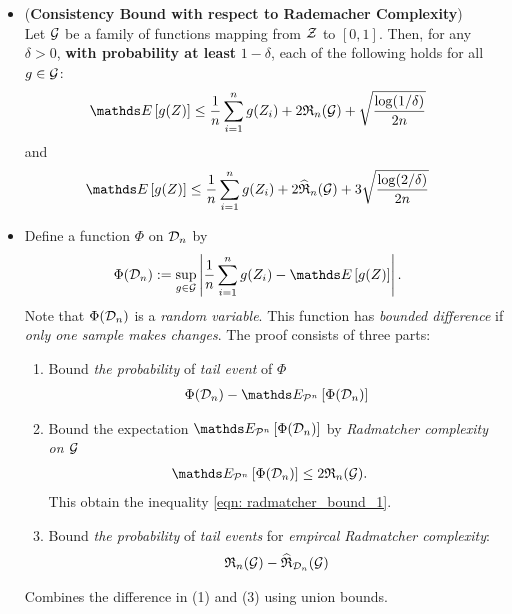\documentclass[11pt]{article}
\begin{document}
\begin{itemize}
\item \begin{proposition} (\textbf{Consistency Bound with respect to Rademacher Complexity}) \citep{mohri2018foundations}\\
Let ${\mathcal G}$ be a family of functions mapping from ${\mathcal Z}$ to $[0, 1]$. Then, for any $\delta > 0$, \textbf{with probability at least} $1 - \delta$, each of the following holds for all $g \in {\mathcal G}$:
\begin{align}
\E{}{g(Z)} &\le \frac{1}{n}\sum_{i=1}^{n}g(Z_i) + 2 \frR_{n}(\cG)  + \sqrt{\frac{\log(1 / \delta)}{2n}} \label{eqn: radmatcher_bound_1}
\end{align}
and
\begin{align}
\E{}{g(Z)} &\le \frac{1}{n}\sum_{i=1}^{n}g(Z_i) + 2 \widehat{\mathfrak{R}}_{n}(\cG) + 3\sqrt{\frac{\log(2 / \delta)}{2n}} \label{eqn: radmatcher_bound_2}
\end{align}
\end{proposition}

\item \begin{remark} 
Define a function $\Phi$ on ${\mathcal D}_n$ by
\begin{align*}
\Phi(\cD_n) &:= \sup_{g \in \cG}\abs{\frac{1}{n}\sum_{i=1}^{n}g(Z_i) - \E{}{g(Z)}}.
\end{align*} Note that $\Phi({\mathcal D}_n)$ is a \emph{random variable}. This function has \emph{bounded difference} if \emph{only one sample makes changes}. The proof consists of three parts:
\begin{enumerate}
\item Bound \emph{the probability} of \emph{tail event} of $\Phi$
\begin{align*}
\Phi(\cD_n) - \E{\cP^{n}}{\Phi(\cD_n)}
\end{align*}
\item Bound the expectation $\E{\cP^{n}}{\Phi(\cD_n)}$ by \emph{Radmatcher complexity on ${\mathcal G}$}
\begin{align*}
\E{\cP^{n}}{\Phi(\cD_n)} &\le 2   \frR_{n}(\cG).
\end{align*} This obtain the inequality \eqref{eqn: radmatcher_bound_1}.

\item Bound \emph{the probability} of \emph{tail events} for \emph{empircal Radmatcher complexity}:
\begin{align*}
{\mathfrak R}_{n}({\mathcal G})  - \widehat{\mathfrak{R}}_{{\mathcal D}_n}({\mathcal G})
\end{align*}
\end{enumerate}
Combines the difference in (1) and (3) using union bounds. 
\end{remark}


\end{itemize}
\end{document}
